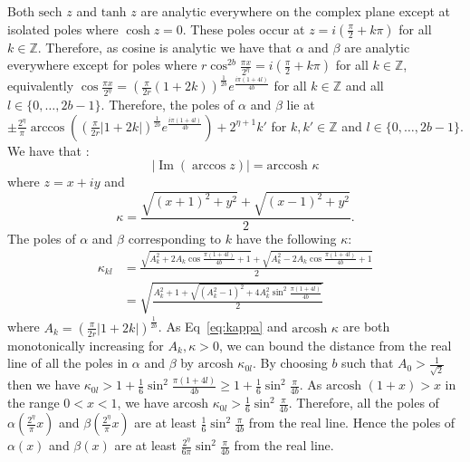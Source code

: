 \documentclass[aps,floatfix,10pt,amssymb,amsfont,amsmath,superscriptaddress,float,nofootinbib,longbibliography,nobalancelastpage,twocolumn]{revtex4-2}
\begin{document}
Both $\text{sech } z$ and $\text{tanh } z$ are analytic everywhere on the complex plane except at isolated poles where $\cosh z = 0$. These poles occur at $z = i(\frac{\pi}{2} + k \pi)$ for all $k \in \mathbb{Z}$. Therefore, as cosine is analytic we have that $\alpha$ and $\beta$ are analytic everywhere except for poles where $r \cos^{2b}\frac{\pi x}{2^{\eta}} = i(\frac{\pi}{2} + k \pi)$ for all $k \in \mathbb{Z}$, equivalently $\cos \frac{\pi x}{2^{\eta}} = (\frac{\pi}{2r}(1+2k))^{\frac{1}{2b}} e^{\frac{i\pi(1+4l)}{4b}}$  for all $k \in \mathbb{Z}$ and all $l \in \{0,\ldots,2b-1\}$. Therefore, the poles of $\alpha$ and $\beta$ lie at $\pm\frac{2^{\eta}}{\pi}\arccos ((\frac{\pi}{2r}|1+2k|)^{\frac{1}{2b}}e^{\frac{i\pi(1+4l)}{4b}}) + 2^{\eta+1} k'$ for $k, k' \in \mathbb{Z}$ and $l \in \{0,\ldots,2b-1\}$. We have that \cite[\href{http://dlmf.nist.gov/4.23.E35}{4.23.35}]{NIST:DLMF}:
\begin{equation}
    |\operatorname{Im}(\arccos z)| = \text{arccosh }{\kappa}
\end{equation}
where $z=x+iy$ and
\begin{equation}
    \kappa = \frac{\sqrt{(x+1)^2 + y^2} + \sqrt{(x-1)^2+y^2}}{2}.
\end{equation}
The poles of $\alpha$ and $\beta$ corresponding to $k$ have the following $\kappa$:
\begin{align}
    \kappa_{kl} &= \frac{\sqrt{A_k^2 + 2A_k\cos \frac{\pi(1+4l)}{4b}+1} +\sqrt{A_k^2 - 2A_k\cos \frac{\pi(1+4l)}{4b}+1}}{2}\\
    &= \sqrt{\frac{A_k^2+1 + \sqrt{(A_k^2-1)^2+4A_k^2\sin^2\frac{\pi(1+4l)}{4b}}}{2}}
    \label{eq:kappa}
\end{align}
where $A_k = (\frac{\pi}{2r}|1+2k|)^{\frac{1}{2b}}$.  As Eq~\eqref{eq:kappa} and $\text{arcosh } \kappa$ are both monotonically increasing for $A_k, \kappa>0$, we can bound the distance from the real line of all the poles in $\alpha$ and $\beta$ by $\text{arcosh } \kappa_{0l}$. By choosing $b$ such that $A_0 > \frac{1}{\sqrt{2}}$ then we have $\kappa_{0l} > 1 + \frac{1}{6}\sin^2\frac{\pi(1+4l)}{4b} \geq 1 + \frac{1}{6}\sin^2\frac{\pi}{4b}$. As $\text{arcosh } (1+x) > x$ in the range $0<x<1$, we have $\text{arcosh } \kappa_{0l} > \frac{1}{6}\sin^2\frac{\pi}{4b}$. Therefore, all the poles of $\alpha(\frac{2^{\eta}}{\pi}x)$ and $\beta(\frac{2^{\eta}}{\pi}x)$ are at least $\frac{1}{6}\sin^2\frac{\pi}{4b}$ from the real line. Hence the poles of $\alpha(x)$ and $\beta(x)$ are at least $\frac{2^{\eta}}{6\pi}\sin^2\frac{\pi}{4b}$ from the real line.
\end{document}
